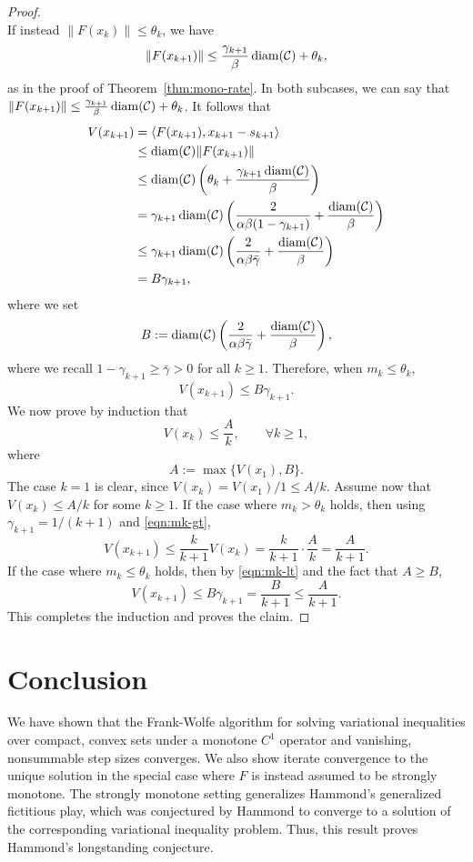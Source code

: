 \documentclass[pdflatex,sn-mathphys-num]{sn-jnl}%
\newcommand\diam{\mathop{\rm diam}}
\newcommand\C{\mathcal{C}}
\theoremstyle{thmstyleone}%
\theoremstyle{thmstyletwo}%
\theoremstyle{thmstylethree}%
\begin{document}
\begin{proof}
\[  \]
  If instead $\lVert F(x_k)\rVert \leq \theta_k$, we have
  \[
    \lVert F(x_{k+1})\rVert \leq \frac{\gamma_{k+1}}{\beta}\diam(\C) + \theta_k,
  \]
  as in the proof of Theorem~\ref{thm:mono-rate}.
  In both subcases, we can say that $\lVert F(x_{k+1})\rVert \leq \frac{\gamma_{k+1}}{\beta}\diam(\C) + \theta_k$.
  It follows that
  \begin{align}
    V(x_{k+1}) &= \langle{F(x_{k+1}), x_{k+1} - s_{k+1}}\rangle\notag\\
            &\leq \diam(\C)\lVert F(x_{k+1})\rVert\notag\\
            &\leq \diam(\C)\left(\theta_k + \frac{\gamma_{k+1} \diam(\C)}{\beta}\right)\notag\\
            &= \gamma_{k+1}\diam(\C)\left(\frac{2}{\alpha \beta (1-\gamma_{k+1})} + \frac{\diam(\C)}{\beta}\right)\notag\\
            &\leq \gamma_{k+1} \diam(\C)\left(\frac{2}{\alpha\beta\bar{\gamma}} + \frac{\diam(\C)}{\beta}\right)\notag\\
            &= B\gamma_{k+1},\label{eqn:mk-lt}
  \end{align}
  where we set
  \[
    B := \diam(\C)\left(\frac{2}{\alpha\beta\bar{\gamma}} + \frac{\diam(\C)}{\beta}\right),
  \]
  where we recall $1-\gamma_{k+1} \geq \bar{\gamma} > 0$ for all $k \geq 1$. Therefore, when $m_k \leq \theta_k$,
  \[
    V(x_{k+1}) \leq B\gamma_{k+1}.
  \]
  We now prove by induction that
  \[
    V(x_k) \leq \frac{A}{k},\qquad\forall k \geq 1,
  \]
  where
  \[
    A := \max\big\{V(x_1), B\big\}.
  \]
  The case $k=1$ is clear, since $V(x_k) = V(x_1)/1 \leq A/k$. Assume now that $V(x_k) \leq A/k$ for some $k \geq 1$.
  If the case where $m_k > \theta_k$ holds, then using $\gamma_{k+1} = 1/(k+1)$ and \eqref{eqn:mk-gt},
  \[
    V(x_{k+1}) \leq \frac{k}{k+1}V(x_k) = \frac{k}{k+1}\cdot\frac{A}{k} = \frac{A}{k+1}.
  \]
  If the case where $m_k \leq \theta_k$ holds, then by \eqref{eqn:mk-lt} and the fact that $A \geq B$,
  \[
    V(x_{k+1}) \leq B\gamma_{k+1} = \frac{B}{k+1} \leq \frac{A}{k+1}.
  \]
  This completes the induction and proves the claim.
\end{proof}

\section{Conclusion}
We have shown that the Frank-Wolfe algorithm for solving variational inequalities over compact, convex sets under a monotone
$C^1$ operator and vanishing, nonsummable step sizes converges. We also show iterate convergence to the unique solution
in the special case where $F$ is instead assumed to be strongly monotone. The strongly monotone setting generalizes
Hammond's generalized fictitious play, which was conjectured by Hammond to converge to a solution of the corresponding
variational inequality problem. Thus, this result proves Hammond's longstanding conjecture.
\end{document}
